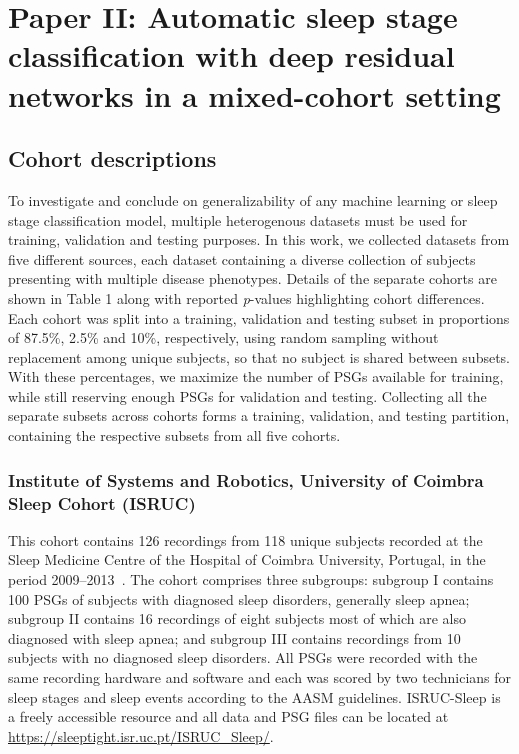 \section{Paper II: Automatic sleep stage classification with deep residual networks in a mixed-cohort setting}\label{sec:paperii}



\subsection{Cohort descriptions}
To investigate and conclude on generalizability of any machine learning or sleep stage classification model, multiple heterogenous datasets must be used for training, validation and testing purposes.
In this work, we collected datasets from five different sources, each dataset containing a diverse collection of subjects presenting with multiple disease phenotypes.
Details of the separate cohorts are shown in Table 1 along with reported \textit{p}-values highlighting cohort differences.
Each cohort was split into a training, validation and testing subset in proportions of 87.5\%, 2.5\% and 10\%, respectively, using random sampling without replacement among unique subjects, so that no subject is shared between subsets.
With these percentages, we maximize the number of PSGs available for training, while still reserving enough PSGs for validation and testing.
Collecting all the separate subsets across cohorts forms a training, validation, and testing partition, containing the respective subsets from all five cohorts. 

\subsubsection{Institute of Systems and Robotics, University of Coimbra Sleep Cohort (ISRUC)}
This cohort contains 126 recordings from 118 unique subjects recorded at the Sleep Medicine Centre of the Hospital of Coimbra University, Portugal, in the period 2009–2013~\cite{Khalighi2016}.
The cohort comprises three subgroups: subgroup I contains 100 PSGs of subjects with diagnosed sleep disorders, generally sleep apnea; subgroup II contains 16 recordings of eight subjects most of which are also diagnosed with sleep apnea; and subgroup III contains recordings from 10 subjects with no diagnosed sleep disorders.
All PSGs were recorded with the same recording hardware and software and each was scored by two technicians for sleep stages and sleep events according to the AASM guidelines.
ISRUC-Sleep is a freely accessible resource and all data and PSG files can be located at \url{https://sleeptight.isr.uc.pt/ISRUC_Sleep/}.

